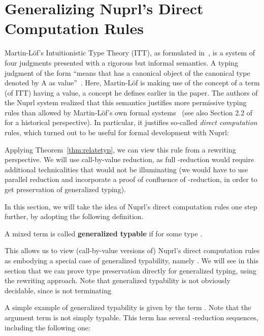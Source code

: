 \documentclass{LMCS}
\begin{document}
\section{Generalizing Nuprl's Direct Computation Rules}
\label{sec:genpresstlc}

Martin-L\"of's Intuitionistic Type Theory (ITT), as formulated
in~\cite{martinloef+84}, is a system of four judgments presented with
a rigorous but informal semantics.  A typing judgment of the form
 ``means that  has a canonical object of the canonical type
denoted by A as value''~\cite[page 174]{martinloef+84}.  Here,
Martin-L\"of is making use of the concept of a term (of ITT) having a
value, a concept he defines earlier in the paper.  The authors of the
Nuprl system realized that this semantics justifies more permissive
typing rules than allowed by Martin-L\"of's own formal
systems~\cite{constable+86} (see also Section 2.2 of~\cite{allen+06}
for a historical perspective).  In particular, it justifies so-called
\emph{direct computation} rules, which turned out to be useful for
formal development with Nuprl:

\noindent Applying Theorem~\ref{thm:relatetyp}, we can view this rule
from a rewriting perspective.  We will use call-by-value reduction, as
full -reduction would require additional technicalities that
would not be illuminating (we would have to use parallel reduction and
incorporate a proof of confluence of -reduction, in order to
get preservation of generalized typing).

\noindent In this section, we will take the idea of Nuprl's direct
computation rules one step further, by adopting the following
definition.

\begin{defi}
A mixed term  is called \textbf{generalized typable}
if  for some type .
\end{defi}

\noindent This allows us to view (call-by-value versions of) Nuprl's
direct computation rules as embodying a special case of generalized
typability, namely .  We will see in this section
that we can prove type preservation directly for generalized typing,
using the rewriting approach.  Note that generalized typability is not
obviously decidable, since  is not terminating

A simple example of generalized typability is given by the
term .  Note that
the argument term  is not simply typable.  This
term has several -reduction sequences, including the following
one:
\end{document}
